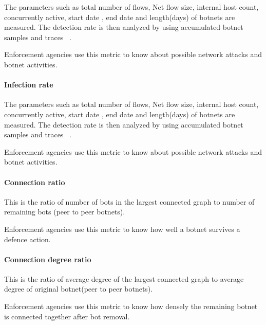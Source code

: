The  parameters such as total number of flows, Net flow size, internal host count, concurrently  active, start date , end date and length(days) of botnets are measured. The detection rate is then analyzed by using accumulated botnet samples and traces ~\cite{haltas2014automated}.

Enforcement agencies use this metric to know about possible network attacks and botnet activities.



\paragraph{ Infection rate }

The  parameters such as total number of flows, Net flow size, internal host count, concurrently  active, start date , end date and length(days) of botnets are measured. The detection rate is then analyzed by using accumulated botnet samples and traces ~\cite{haltas2014automated}.

Enforcement agencies use this metric to know about possible network attacks and botnet activities.

\paragraph{ Connection ratio }

This is the ratio of number of bots in the largest connected graph to number of remaining bots (peer to peer botnets).

Enforcement agencies use this metric to know how well a botnet survives a defence action.

\paragraph{ Connection degree ratio }

This is the ratio of average degree of the largest connected graph to average degree of original botnet(peer to peer botnets).

Enforcement agencies use this metric to know how densely the remaining botnet is connected together after bot removal.


